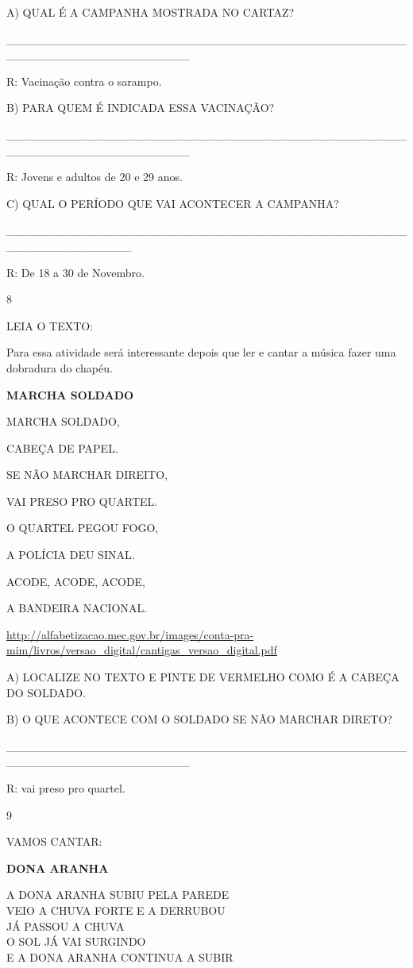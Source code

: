 {{A) QUAL É A CAMPANHA MOSTRADA NO CARTAZ?

\_\_\_\_\_\_\_\_\_\_\_\_\_\_\_\_\_\_\_\_\_\_\_\_\_\_\_\_\_\_\_\_\_\_\_\_\_\_\_\_\_\_\_\_\_\_\_\_\_\_\_\_\_\_\_\_\_\_\_\_\_\_\_\_\_\_\_\_\_\_

R: Vacinação contra o sarampo.

B) PARA QUEM É INDICADA ESSA VACINAÇÃO?

\_\_\_\_\_\_\_\_\_\_\_\_\_\_\_\_\_\_\_\_\_\_\_\_\_\_\_\_\_\_\_\_\_\_\_\_\_\_\_\_\_\_\_\_\_\_\_\_\_\_\_\_\_\_\_\_\_\_\_\_\_\_\_\_\_\_\_\_\_\_

R: Jovens e adultos de 20 e 29 anos.

C) QUAL O PERÍODO QUE VAI ACONTECER A CAMPANHA?

\_\_\_\_\_\_\_\_\_\_\_\_\_\_\_\_\_\_\_\_\_\_\_\_\_\_\_\_\_\_\_\_\_\_\_\_\_\_\_\_\_\_\_\_\_\_\_\_\_\_\_\_\_\_\_\_\_\_\_\_\_\_\_

R: De 18 a 30 de Novembro.

\num{8}

LEIA O TEXTO:

Para essa atividade será interessante depois que ler e cantar a música
fazer uma dobradura do chapéu.

\textbf{MARCHA SOLDADO}

MARCHA SOLDADO,

CABEÇA DE PAPEL.

SE NÃO MARCHAR DIREITO,

VAI PRESO PRO QUARTEL.

O QUARTEL PEGOU FOGO,

A POLÍCIA DEU SINAL.

ACODE, ACODE, ACODE,

A BANDEIRA NACIONAL.

\url{http://alfabetizacao.mec.gov.br/images/conta-pra-mim/livros/versao_digital/cantigas_versao_digital.pdf}

A) LOCALIZE NO TEXTO E PINTE DE VERMELHO COMO É A CABEÇA DO SOLDADO.

B) O QUE ACONTECE COM O SOLDADO SE NÃO MARCHAR DIRETO?

\_\_\_\_\_\_\_\_\_\_\_\_\_\_\_\_\_\_\_\_\_\_\_\_\_\_\_\_\_\_\_\_\_\_\_\_\_\_\_\_\_\_\_\_\_\_\_\_\_\_\_\_\_\_\_\_\_\_\_\_\_\_\_\_\_\_\_\_\_\_

R: vai preso pro quartel.

\num{9}

VAMOS CANTAR:

\textbf{DONA ARANHA}

A DONA ARANHA SUBIU PELA PAREDE\\
VEIO A CHUVA FORTE E A DERRUBOU\\
JÁ PASSOU A CHUVA\\
O SOL JÁ VAI SURGINDO\\
E A DONA ARANHA CONTINUA A SUBIR

}}
